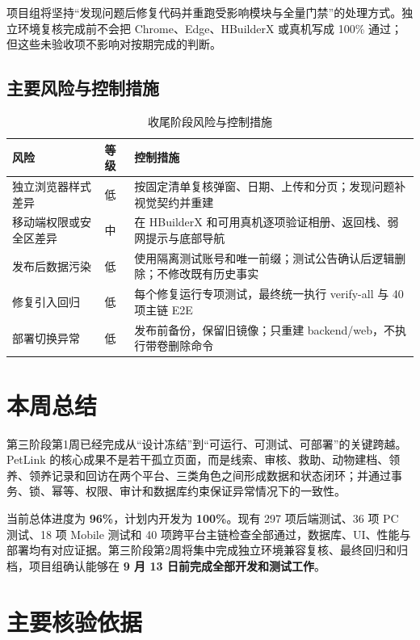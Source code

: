 \documentclass[UTF8,a4paper,zihao=-4,fontset=mac]{ctexart}
\begin{document}
项目组将坚持“发现问题后修复代码并重跑受影响模块与全量门禁”的处理方式。独立环境复核完成前不会把 Chrome、Edge、HBuilderX 或真机写成 100\% 通过；但这些未验收项不影响对按期完成的判断。

\subsection{主要风险与控制措施}

\begin{table}[H]
\centering
\caption{收尾阶段风险与控制措施}
\label{tab:risks}
\begin{tabularx}{\textwidth}{L{3.2cm}C{1.8cm}Y}
\toprule
{}\color{white}\bfseries 风险 & \color{white}\bfseries 等级 & \color{white}\bfseries 控制措施 \\
\midrule
独立浏览器样式差异 & 低 & 按固定清单复核弹窗、日期、上传和分页；发现问题补视觉契约并重建 \\
移动端权限或安全区差异 & 中 & 在 HBuilderX 和可用真机逐项验证相册、返回栈、弱网提示与底部导航 \\
发布后数据污染 & 低 & 使用隔离测试账号和唯一前缀；测试公告确认后逻辑删除；不修改既有历史事实 \\
修复引入回归 & 低 & 每个修复运行专项测试，最终统一执行 verify-all 与 40 项主链 E2E \\
部署切换异常 & 低 & 发布前备份，保留旧镜像；只重建 backend/web，不执行带卷删除命令 \\
\bottomrule
\end{tabularx}
\end{table}

\section{本周总结}

第三阶段第1周已经完成从“设计冻结”到“可运行、可测试、可部署”的关键跨越。PetLink 的核心成果不是若干孤立页面，而是线索、审核、救助、动物建档、领养、领养记录和回访在两个平台、三类角色之间形成数据和状态闭环；并通过事务、锁、幂等、权限、审计和数据库约束保证异常情况下的一致性。

当前总体进度为 \textbf{96\%}，计划内开发为 \textbf{100\%}。现有 297 项后端测试、36 项 PC 测试、18 项 Mobile 测试和 40 项跨平台主链检查全部通过，数据库、UI、性能与部署均有对应证据。第三阶段第2周将集中完成独立环境兼容复核、最终回归和归档，项目组确认能够在 \textbf{9 月 13 日前完成全部开发和测试工作}。

\appendix
\section{主要核验依据}
\end{document}
